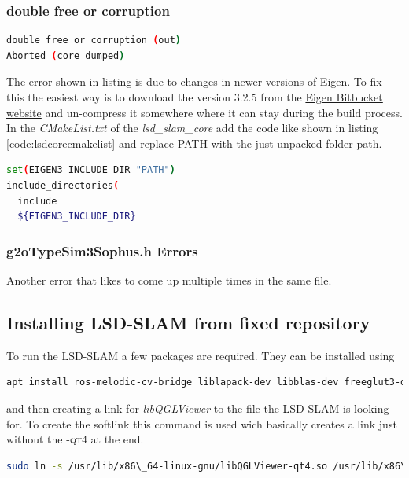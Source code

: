 \subsubsection{double free or corruption}
\begin{lstlisting}[language=bash]
double free or corruption (out)
Aborted (core dumped)
\end{lstlisting}
The error shown in listing is due to changes in newer versions of Eigen. To fix this the easiest way is to download the version \textsc{3.2.5} from the \href{https://bitbucket.org/eigen/eigen/downloads/?tab=tags}{Eigen Bitbucket website} \cite{eigenbitbucket} and un-compress it somewhere where it can stay during the build process.
In the \textit{CMakeList.txt} of the \textit{lsd\_slam\_core} add the code like shown in listing \ref{code:lsdcorecmakelist} and replace \textsc{PATH} with the just unpacked folder path.
\begin{lstlisting}[language=bash, label={code:lsdcorecmakelist}, caption={CMakeList in lsd\_slam\_core with fix for Eigen}]
set(EIGEN3_INCLUDE_DIR "PATH")
include_directories(
  include
  ${EIGEN3_INCLUDE_DIR}
\end{lstlisting}

\subsubsection{g2oTypeSim3Sophus.h Errors}
Another error that likes to come up multiple times in the same file. 


\subsection{Installing LSD-SLAM from fixed repository}
To run the LSD-SLAM a few packages are required. They can be installed using\newline
\begin{lstlisting}[language=bash, caption={Installing prerequisites for LSD-SLAM}]
    apt install ros-melodic-cv-bridge liblapack-dev libblas-dev freeglut3-dev libqglviewer-dev-qt4 libsuitesparse-dev libx11-dev
\end{lstlisting}

and then creating a link for \textit{libQGLViewer} to the file the LSD-SLAM is looking for. To create the softlink this command is used wich basically creates a link just without the \textsc{-qt4} at the end.\newline
\begin{lstlisting}[language=bash,caption={Creating softlink for libQGLViewer.so}]
    sudo ln -s /usr/lib/x86\_64-linux-gnu/libQGLViewer-qt4.so /usr/lib/x86\_64-linux-gnu/libQGLViewer.so
\end{lstlisting}

